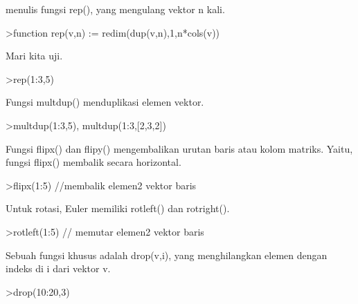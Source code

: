 \documentclass{article}
\begin{document}
\begin{eulernotebook}
\begin{eulercomment}
\begin{eulercomment}
\begin{eulercomment}
\begin{eulercomment}
\begin{eulercomment}
menulis fungsi rep(), yang mengulang vektor n kali.
\end{eulercomment}
\begin{eulerprompt}
>function rep(v,n) := redim(dup(v,n),1,n*cols(v))
\end{eulerprompt}
\begin{eulercomment}
Mari kita uji.
\end{eulercomment}
\begin{eulerprompt}
>rep(1:3,5)
\end{eulerprompt}
\begin{euleroutput}
  [1,  2,  3,  1,  2,  3,  1,  2,  3,  1,  2,  3,  1,  2,  3]
\end{euleroutput}
\begin{eulercomment}
Fungsi multdup() menduplikasi elemen vektor.
\end{eulercomment}
\begin{eulerprompt}
>multdup(1:3,5), multdup(1:3,[2,3,2])
\end{eulerprompt}
\begin{euleroutput}
  [1,  1,  1,  1,  1,  2,  2,  2,  2,  2,  3,  3,  3,  3,  3]
  [1,  1,  2,  2,  2,  3,  3]
\end{euleroutput}
\begin{eulercomment}
Fungsi flipx() dan flipy() mengembalikan urutan baris atau kolom
matriks. Yaitu, fungsi flipx() membalik secara horizontal.
\end{eulercomment}
\begin{eulerprompt}
>flipx(1:5) //membalik elemen2 vektor baris
\end{eulerprompt}
\begin{euleroutput}
  [5,  4,  3,  2,  1]
\end{euleroutput}
\begin{eulercomment}
Untuk rotasi, Euler memiliki rotleft() dan rotright().
\end{eulercomment}
\begin{eulerprompt}
>rotleft(1:5) // memutar elemen2 vektor baris
\end{eulerprompt}
\begin{euleroutput}
  [2,  3,  4,  5,  1]
\end{euleroutput}
\begin{eulercomment}
Sebuah fungsi khusus adalah drop(v,i), yang menghilangkan elemen
dengan indeks di i dari vektor v.
\end{eulercomment}
\begin{eulerprompt}
>drop(10:20,3)
\end{eulerprompt}

\end{eulercomment}
\end{eulercomment}
\end{eulercomment}
\end{eulercomment}
\end{eulernotebook}
\end{document}
